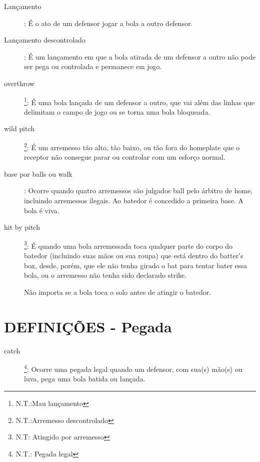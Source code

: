 	\begin{description}	
	\item[Lan\c{c}amento]: \'E o ato de um defensor jogar a bola a outro defensor.

	\item[Lan\c{c}amento descontrolado]: \'E um lan\c{c}amento em que a bola atirada de um defensor a outro n\~ao pode ser pega ou controlada e permanece em jogo. 

	\item[\Gls{overthrow}]\footnote{N.T.:Mau lan\c{c}amento}: \'E uma bola lan\c{c}ada de um defensor a outro, que vai al\'em das linhas que delimitam o campo de jogo ou se torna uma bola bloqueada. 

	\item[\gls{wild pitch}]\footnote{N.T.:Arremesso descontrolado}: \'E um arremesso t\~ao alto, t\~ao baixo, ou t\~ao fora do \gls{homeplate} que o receptor n\~ao consegue parar ou controlar com um esfor\c{c}o normal. 
	
	\item[base por \glspl{ball} ou \gls{walk} ]: Ocorre quando quatro arremessos s\~ao julgados \gls{ball} pelo \'arbitro de \gls{home}, incluindo arremessos ilegais. Ao batedor \'e concedido a primeira base. A bola \'e viva. 


	\item[\Gls{hit by pitch}]\footnote{N.T: Atingido por arremesso}:	\'E quando uma bola arremessada toca qualquer parte do corpo do batedor (incluindo suas m\~aos ou sua roupa) que est\'a dentro do \gls{batter's box}, desde, por\'em, que ele n\~ao tenha girado o \gls{bat} para tentar bater essa bola, ou o arremesso n\~ao tenha sido declarado \gls{strike}. 
	
	N\~ao importa se a bola toca o solo antes de atingir o batedor. 
	\end{description}

\section{DEFINI\c{C}\~OES - Pegada}

	\begin{description}		
		\item[\Gls{catch}]\footnote{N.T.: Pegada legal}: Ocorre uma pegada legal quando um defensor, com sua(s) m\~ao(s) ou luva, pega uma bola batida ou lan\c{c}ada. 
	\end{description}
	

